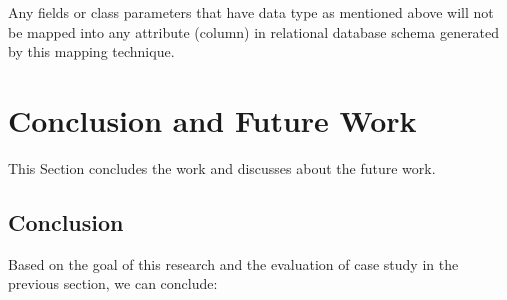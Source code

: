 \documentclass[runningheads,a4paper]{llncs}
\begin{document}
Any fields or class parameters that have data type as mentioned above will not be mapped into any attribute (column) in relational database schema generated by this mapping technique.


\section{Conclusion and Future Work}
This Section concludes the work and discusses about the future work.

\subsection{Conclusion}
Based on the goal of this research and the evaluation of case study in the previous section, we can conclude:
\end{document}
